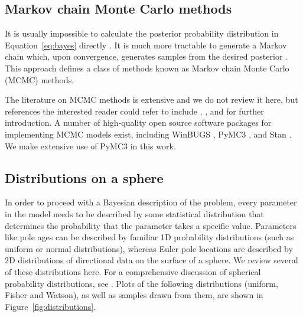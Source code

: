 \documentclass[11pt,letterpaper]{article}
\begin{document}
\subsection*{Markov chain Monte Carlo methods}

It is usually impossible to calculate the posterior probability distribution in Equation~\eqref{eq:bayes} directly \citep{Davidson-Pilon2015a}.  It is much more tractable to generate a Markov chain which, upon convergence, generates samples from the desired posterior \citep{Gelman2013a}. This approach defines a class of methods known as Markov chain Monte Carlo (MCMC) methods.

The literature on MCMC methods is extensive and we do not review it here, but references the interested reader could refer to include \citet{Gelman1996a}, \citet{Sambridge2013a}, and \citet{Davidson-Pilon2015a} for further introduction. A number of high-quality open source software packages for implementing MCMC models exist, including WinBUGS \citep{Lunn2000a}, PyMC3 \citep{Salvatier2016a}, and Stan \citep{Carpenter2017a}. We make extensive use of PyMC3 in this work.

\subsection*{Distributions on a sphere}

In order to proceed with a Bayesian description of the problem, every parameter in the model needs to be described by some statistical distribution that determines the probability that the parameter takes a specific value. Parameters like pole ages can be described by familiar 1D probability distributions (such as uniform or normal distributions), whereas Euler pole locations are described by 2D distributions of directional data on the surface of a sphere. We review several of these distributions here. For a comprehensive discussion of spherical probability distributions, see \citet{Fisher1987b}. Plots of the following distributions (uniform, Fisher and Watson), as well as samples drawn from them, are shown in Figure~\ref{fig:distributions}. 
\end{document}
